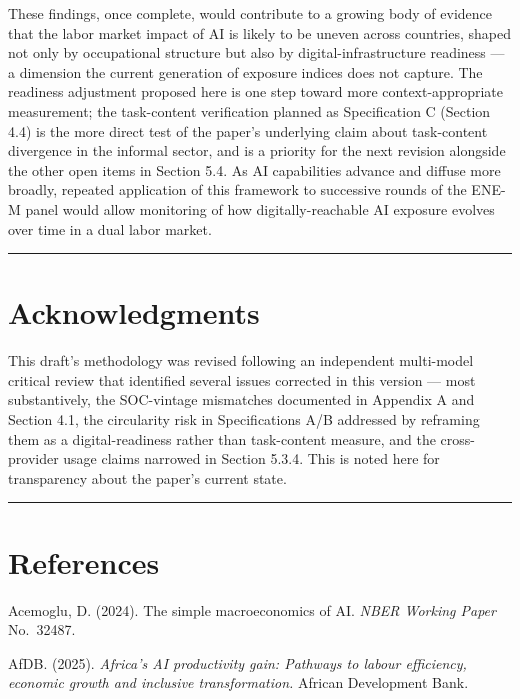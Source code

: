 \documentclass[
  11pt,
]{article}
\begin{document}
These findings, once complete, would contribute to a growing body of
evidence that the labor market impact of AI is likely to be uneven
across countries, shaped not only by occupational structure but also by
digital-infrastructure readiness --- a dimension the current generation
of exposure indices does not capture. The readiness adjustment proposed
here is one step toward more context-appropriate measurement; the
task-content verification planned as Specification C (Section 4.4) is
the more direct test of the paper's underlying claim about task-content
divergence in the informal sector, and is a priority for the next
revision alongside the other open items in Section 5.4. As AI
capabilities advance and diffuse more broadly, repeated application of
this framework to successive rounds of the ENE-M panel would allow
monitoring of how digitally-reachable AI exposure evolves over time in a
dual labor market.

\begin{center}\rule{0.5\linewidth}{0.5pt}\end{center}

\section{Acknowledgments}\label{acknowledgments}

This draft's methodology was revised following an independent
multi-model critical review that identified several issues corrected in
this version --- most substantively, the SOC-vintage mismatches
documented in Appendix A and Section 4.1, the circularity risk in
Specifications A/B addressed by reframing them as a digital-readiness
rather than task-content measure, and the cross-provider usage claims
narrowed in Section 5.3.4. This is noted here for transparency about the
paper's current state.

\begin{center}\rule{0.5\linewidth}{0.5pt}\end{center}

\section{References}\label{references}

Acemoglu, D. (2024). The simple macroeconomics of AI. \emph{NBER Working
Paper} No.~32487.

AfDB. (2025). \emph{Africa's AI productivity gain: Pathways to labour
efficiency, economic growth and inclusive transformation.} African
Development Bank.
\end{document}
